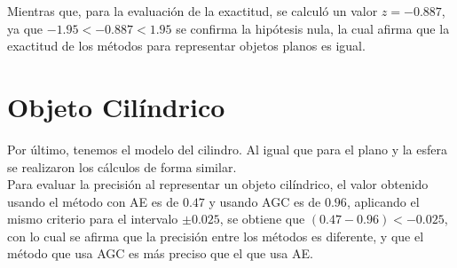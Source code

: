 Mientras que, para la evaluación de la exactitud, se calculó un valor $z=-0.887$, ya que $-1.95<-0.887<1.95$ se confirma la hipótesis nula, la cual afirma que la exactitud de los métodos para representar objetos planos es igual.


%
%
%
%
%
%
%



\section{Objeto Cilíndrico}

Por último, tenemos el modelo del \gls{cilindro}. Al igual que para el plano y la esfera se realizaron los cálculos de forma similar.\\

Para evaluar la precisión al representar un objeto cilíndrico, el valor obtenido  usando el método con AE es de $0.47$ y usando AGC es de $0.96$, aplicando el mismo criterio para el intervalo $\pm 0.025$, se obtiene que $(0.47-0.96)<-0.025$, con lo cual se afirma que la precisión entre los métodos es diferente, y que el método que usa AGC es más preciso que el que usa AE.\\

